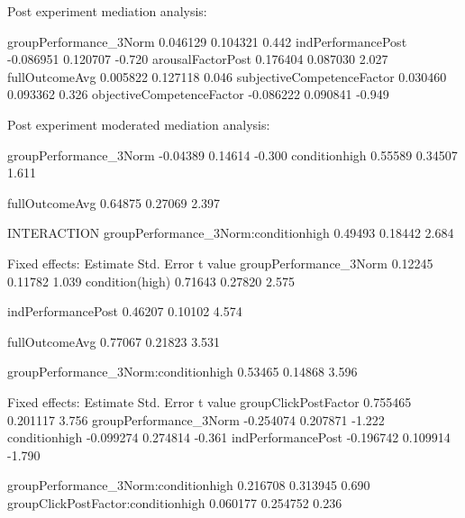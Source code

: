 Post experiment mediation analysis:

groupPerformance_3Norm      0.046129   0.104321   0.442
indPerformancePost         -0.086951   0.120707  -0.720
arousalFactorPost           0.176404   0.087030   2.027
fullOutcomeAvg              0.005822   0.127118   0.046
subjectiveCompetenceFactor  0.030460   0.093362   0.326
objectiveCompetenceFactor  -0.086222   0.090841  -0.949















Post experiment moderated mediation analysis:

groupPerformance_3Norm               -0.04389    0.14614  -0.300
conditionhigh                         0.55589    0.34507   1.611

fullOutcomeAvg                        0.64875    0.27069   2.397

INTERACTION
groupPerformance_3Norm:conditionhigh  0.49493    0.18442   2.684

Fixed effects:
                                     Estimate Std. Error t value
groupPerformance_3Norm                0.12245    0.11782   1.039
condition(high)                       0.71643    0.27820   2.575

indPerformancePost                    0.46207    0.10102   4.574

fullOutcomeAvg                        0.77067    0.21823   3.531

groupPerformance_3Norm:conditionhigh  0.53465    0.14868   3.596

Fixed effects:
                                      Estimate Std. Error t value
groupClickPostFactor                  0.755465   0.201117   3.756
groupPerformance_3Norm               -0.254074   0.207871  -1.222
conditionhigh                        -0.099274   0.274814  -0.361
indPerformancePost                   -0.196742   0.109914  -1.790

groupPerformance_3Norm:conditionhigh  0.216708   0.313945   0.690
groupClickPostFactor:conditionhigh    0.060177   0.254752   0.236























